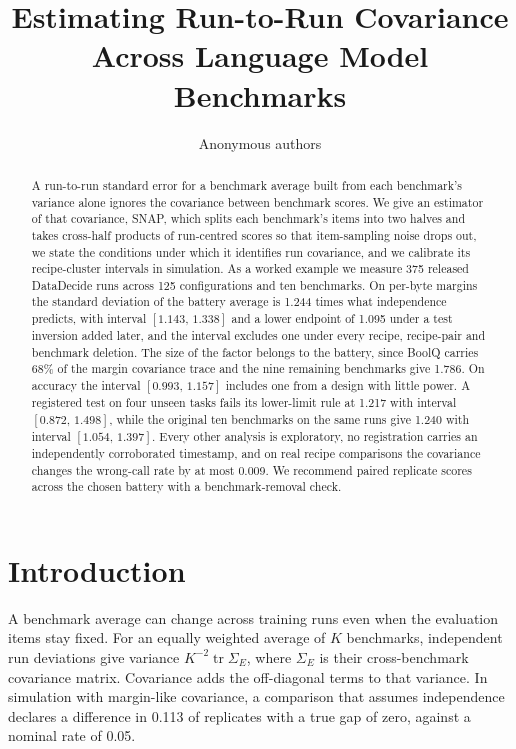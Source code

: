 \documentclass{article}
\title{Estimating Run-to-Run Covariance\\Across Language Model Benchmarks}
\author{Anonymous authors}
\newcommand{\ci}[2]{\ensuremath{[#1,\,#2]}}
\newcommand{\Sig}{\Sigma_E}
\begin{document}
\maketitle
\begin{abstract}
A run-to-run standard error for a benchmark average built from each benchmark's variance alone ignores the covariance between benchmark scores. We give an estimator of that covariance, SNAP, which splits each benchmark's items into two halves and takes cross-half products of run-centred scores so that item-sampling noise drops out, we state the conditions under which it identifies run covariance, and we calibrate its recipe-cluster intervals in simulation. As a worked example we measure 375 released DataDecide runs across 125 configurations and ten benchmarks. On per-byte margins the standard deviation of the battery average is 1.244 times what independence predicts, with interval \ci{1.143}{1.338} and a lower endpoint of 1.095 under a test inversion added later, and the interval excludes one under every recipe, recipe-pair and benchmark deletion. The size of the factor belongs to the battery, since BoolQ carries 68\% of the margin covariance trace and the nine remaining benchmarks give 1.786. On accuracy the interval \ci{0.993}{1.157} includes one from a design with little power. A registered test on four unseen tasks fails its lower-limit rule at 1.217 with interval \ci{0.872}{1.498}, while the original ten benchmarks on the same runs give 1.240 with interval \ci{1.054}{1.397}. Every other analysis is exploratory, no registration carries an independently corroborated timestamp, and on real recipe comparisons the covariance changes the wrong-call rate by at most 0.009. We recommend paired replicate scores across the chosen battery with a benchmark-removal check.
\end{abstract}

\section{Introduction}
A benchmark average can change across training runs even when the evaluation items stay fixed. For an equally weighted average of $K$ benchmarks, independent run deviations give variance $K^{-2}\operatorname{tr}\Sig$, where $\Sig$ is their cross-benchmark covariance matrix. Covariance adds the off-diagonal terms to that variance. In simulation with margin-like covariance, a comparison that assumes independence declares a difference in 0.113 of replicates with a true gap of zero, against a nominal rate of 0.05.
\end{document}
